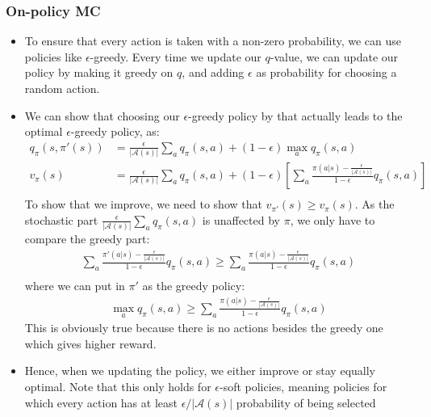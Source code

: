 \subsubsection{On-policy MC}
\begin{itemize}
	\item To ensure that every action is taken with a non-zero probability, we can use policies like $\epsilon$-greedy. Every time we update our $q$-value, we can update our policy by making it greedy on $q$, and adding $\epsilon$ as probability for choosing a random action.
	\item We can show that choosing our $\epsilon$-greedy policy by that actually leads to the optimal $\epsilon$-greedy policy, as:
	\begin{equation*}
		\begin{split}
			q_{\pi}(s,\pi'(s)) & =\frac{\epsilon}{|\mathcal{A}(s)|}\sum_a q_{\pi}(s,a) + \left(1-\epsilon\right)\max_a q_{\pi}(s,a)\\
			v_{\pi}(s) & = \frac{\epsilon}{|\mathcal{A}(s)|} \sum_a q_{\pi}(s,a) + (1-\epsilon)\left[\sum_{a}\frac{\pi(a|s)-\frac{\epsilon}{|\mathcal{A}(s)|}}{1-\epsilon} q_{\pi}(s,a)\right]\\
		\end{split}
	\end{equation*}
	To show that we improve, we need to show that $v_{\pi'}(s)\geq v_{\pi}(s)$. As the stochastic part $\frac{\epsilon}{|\mathcal{A}(s)|} \sum_a q_{\pi}(s,a)$ is unaffected by $\pi$, we only have to compare the greedy part:
	\begin{equation*}
		\begin{split}
			\sum_{a}\frac{\pi'(a|s)-\frac{\epsilon}{|\mathcal{A}(s)|}}{1-\epsilon} q_{\pi}(s,a) \geq \sum_{a}\frac{\pi(a|s)-\frac{\epsilon}{|\mathcal{A}(s)|}}{1-\epsilon} q_{\pi}(s,a)\\
		\end{split}
	\end{equation*}
	where we can put in $\pi'$ as the greedy policy:
	\begin{equation*}
		\begin{split}
			\max_a q_{\pi}(s,a) \geq \sum_{a}\frac{\pi(a|s)-\frac{\epsilon}{|\mathcal{A}(s)|}}{1-\epsilon} q_{\pi}(s,a)
		\end{split}
	\end{equation*}
	This is obviously true because there is no actions besides the greedy one which gives higher reward. 
	\item Hence, when we updating the policy, we either improve or stay equally optimal. Note that this only holds for $\epsilon$-soft policies, meaning policies for which every action has at least $\epsilon/|\mathcal{A}(s)|$ probability of being selected
\end{itemize}
